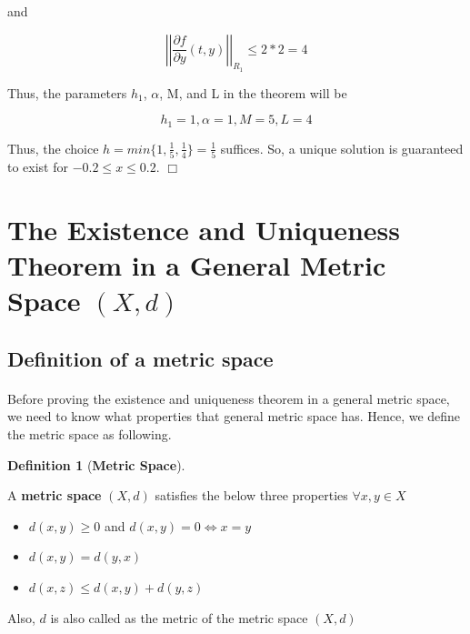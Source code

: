 \documentclass{article}
\theoremstyle{definition}
\newtheorem{definition}{Definition}[section]
\theoremstyle{remark}
\theoremstyle{example}
\newcommand{\qedwhite}{\hfill \ensuremath{\Box}}
\begin{document}
and

\begin{equation}
    \left\lvert\left\lvert \frac{\partial f}{\partial y} (t,y) \right\rvert\right\rvert_{R_1} \leq 2*2 = 4
\end{equation}

Thus, the parameters $h_1$, $\alpha$, M, and L in the theorem will be

\begin{equation}
    h_1 = 1, \alpha = 1, M = 5, L = 4
\end{equation}

Thus, the choice $h = min\{ 1, \tfrac{1}{5}, \tfrac{1}{4} \} = \tfrac{1}{5}$ suffices. So, a unique solution is guaranteed to exist for $-0.2 \leq x \leq 0.2$. \qedwhite

\section{The Existence and Uniqueness Theorem in a General Metric Space $(X,d)$}

\subsection{Definition of a metric space}

\paragraph{  }
Before proving the existence and uniqueness theorem in a general metric space, we need to know what properties that general metric space has. Hence, we define the metric space as following.

\begin{definition}[\textbf{Metric Space}]\label{def:matricSpace}

A \textbf{metric space} $(X,d)$ satisfies the below three properties $\forall x,y \in X$ 

\begin{itemize}
    \item $d(x,y) \geq 0$ and $d(x,y) = 0 \Longleftrightarrow x = y$
    \item $d(x,y) = d(y,x)$
    \item $d(x,z) \leq d(x,y) + d(y,z)$
\end{itemize}

Also, $d$ is also called as the metric of the metric space $(X,d)$
\end{definition}

\paragraph{  }
\end{document}
